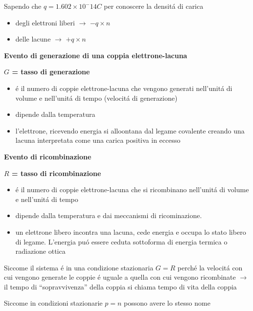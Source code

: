 \documentclass{article}
\begin{document}
Sapendo che $q=1.602\times10^-14 C$ per conoscere la densit\'a di carica
\begin{itemize}
    \item degli elettroni liberi $\rightarrow$ $-q\times n$
    \item delle lacune $\rightarrow$ $+q \times n$
\end{itemize}

\begin{multicols}{2}
    \textbf{Evento di generazione di una coppia elettrone-lacuna}

    \textbf{$G$ = tasso di generazione}

    \begin{itemize}
        \item \'e il numero di coppie elettrone-lacuna che vengono generati nell'unit\'a di volume e nell'unit\'a di tempo (velocit\'a di generazione)
        \item dipende dalla temperatura

        \item l'elettrone, ricevendo energia si alloontana dal legame covalente creando una lacuna interpretata come una carica positiva in eccesso
    \end{itemize}


    \columnbreak{}
    \textbf{Evento di ricombinazione}

    \textbf{$R$ = tasso di ricombinazione}
    \begin{itemize}
        \item \'e il numero di coppie elettrone-lacuna che si ricombinano nell'unit\'a di volume e nell'unit\'a di tempo
        \item dipende dalla temperatura e dai meccanismi di ricominazione.
        \item un elettrone libero incontra una lacuna, cede energia e occupa lo stato libero di legame.
            L'energia pu\'o essere ceduta sottoforma di energia termica o radiazione ottica
    \end{itemize}

\end{multicols}

Siccome il sistema \'e in una condizione stazionaria $G=R$ perch\'e la velocit\'a con cui vengono generate le coppie \'e uguale a quella con cui vengono ricombinate $\rightarrow$ il tempo di ``sopravvivenza'' della coppia si chiama tempo di vita della coppia

Siccome in condizioni stazionarie $p=n$ possono avere lo stesso nome
\end{document}
